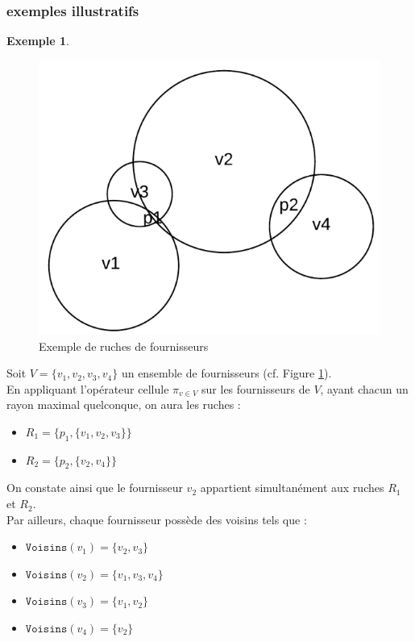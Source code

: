 \documentclass[a4paper,12pt]{report}
\theoremstyle{break}
\theoremstyle{break}
\theoremstyle{break}
\theoremstyle{break}
\theoremstyle{definition}
\newtheorem*{example}{Exemple}
\theoremstyle{remark}
\begin{document}
\subsubsection{exemples illustratifs}
\begin{example}
\begin{figure}
  \centering
  \includegraphics[scale=0.3]{images/exemple_introductif1.png}
  \caption{Exemple de ruches de fournisseurs}
  \label{fig:exemple_introductif_1}
\end{figure}

Soit $V = \{v_1, v_2, v_3, v_4\}$ un ensemble de fournisseurs (cf. Figure \ref{fig:exemple_introductif_1}).\\
En appliquant l'opérateur cellule $\pi_{v \in V}$ sur les fournisseurs de $V$, ayant chacun un rayon maximal quelconque, on aura les ruches :
\begin{itemize}
  \item{$R_1 = \{p_1, \{v_1, v_2, v_3\}\}$}
  \item{$R_2 = \{p_2, \{v_2, v_4\}\}$}
\end{itemize}
On constate ainsi que le fournisseur $v_2$ appartient simultanément aux ruches $R_1$ et $R_2$.\\
Par ailleurs, chaque fournisseur possède des voisins tels que :
\begin{itemize}
  \item{$\texttt{Voisins}(v_1) = \{v_2, v_3\}$}
  \item{$\texttt{Voisins}(v_2) = \{v_1, v_3, v_4\}$}
  \item{$\texttt{Voisins}(v_3) = \{v_1, v_2\}$}
  \item{$\texttt{Voisins}(v_4) = \{v_2\}$}
\end{itemize}
\end{example}
\end{document}
